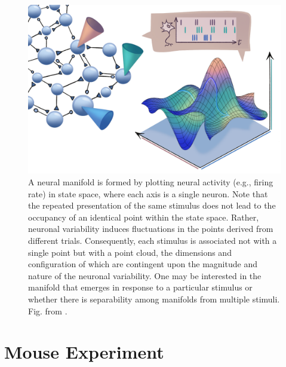 \documentclass[11pt,a4paper]{article}
\begin{document}
\begin{figure}
    \centering
    \includegraphics[width=0.75\linewidth]{figs/manifold_schematic.png}
    \caption{A neural manifold is formed by plotting neural activity (e.g., firing rate) in state space, where each axis is a single neuron. Note that the repeated presentation of the same stimulus does not lead to the occupancy of an identical point within the state space. Rather, neuronal variability induces fluctuations in the points derived from different trials. Consequently, each stimulus is associated not with a single point but with a point cloud, the dimensions and configuration of which are contingent upon the magnitude and nature of the neuronal variability. One may be interested in the manifold that emerges in response to a particular stimulus or whether there is separability among manifolds from multiple stimuli. Fig. from \cite{Perich2024}.}
    \label{fig:manifolds}
\end{figure}


\section{Mouse Experiment}
\end{document}
